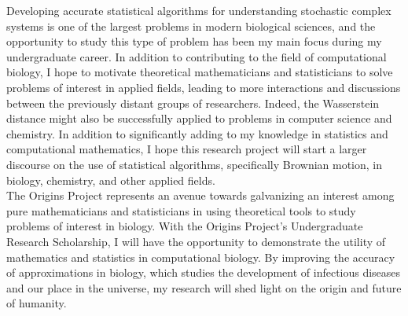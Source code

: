 \documentclass[8 pt, leqno]{article}
\begin{document}
\indent Developing accurate statistical algorithms for understanding stochastic complex systems is one of the largest problems in modern biological sciences, and the opportunity to study this type of problem has been my main focus during my undergraduate career. In addition to contributing to the field of computational biology, I hope to motivate theoretical mathematicians and statisticians to solve problems of interest in applied fields, leading to more interactions and discussions between the previously distant groups of researchers. Indeed, the Wasserstein distance might also be successfully applied to problems in computer science and chemistry. In addition to significantly adding to my knowledge in statistics and computational mathematics, I hope this research project will start a larger discourse on the use of statistical algorithms, specifically Brownian motion, in biology, chemistry, and other applied fields. \\
\indent The Origins Project represents an avenue towards galvanizing an interest among pure mathematicians and statisticians in using theoretical tools to study problems of interest in biology. With the Origins Project’s Undergraduate Research Scholarship, I will have the opportunity to demonstrate the utility of mathematics and statistics in computational biology. By improving the accuracy of approximations in biology, which studies the development of infectious diseases and our place in the universe, my research will shed light on the origin and future of humanity.
\end{document}
